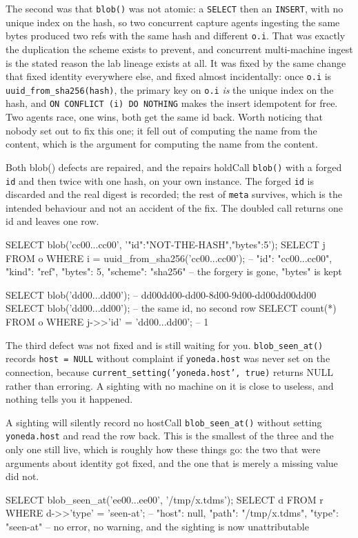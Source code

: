 The second was that \texttt{blob()} was not atomic: a \texttt{SELECT} then an \texttt{INSERT}, with no unique index on the hash, so two concurrent capture agents ingesting the same bytes produced two refs with the same hash and different \texttt{o.i}. That was exactly the duplication the scheme exists to prevent, and concurrent multi-machine ingest is the stated reason the lab lineage exists at all. It was fixed by the same change that fixed identity everywhere else, and fixed almost incidentally: once \texttt{o.i} is \texttt{uuid\_from\_sha256(hash)}, the primary key on \texttt{o.i} \emph{is} the unique index on the hash, and \texttt{ON CONFLICT (i) DO NOTHING} makes the insert idempotent for free. Two agents race, one wins, both get the same id back. Worth noticing that nobody set out to fix this one; it fell out of computing the name from the content, which is the argument for computing the name from the content.

\begin{Correspondence}{Both blob() defects are repaired, and the repairs hold}{Call \texttt{blob()} with a forged \texttt{id} and then twice with one hash, on your own instance.}
The forged \texttt{id} is discarded and the real digest is recorded; the rest of \texttt{meta} survives, which is the intended behaviour and not an accident of the fix. The doubled call returns one id and leaves one row.
\begin{Check}
SELECT blob('cc00...cc00', '{"id":"NOT-THE-HASH","bytes":5}');
SELECT j FROM o WHERE i = uuid_from_sha256('cc00...cc00');
--   {"id": "cc00...cc00", "kind": "ref", "bytes": 5, "scheme": "sha256"}
--   the forgery is gone, "bytes" is kept

SELECT blob('dd00...dd00');   -- dd00dd00-dd00-8d00-9d00-dd00dd00dd00
SELECT blob('dd00...dd00');   -- the same id, no second row
SELECT count(*) FROM o WHERE j->>'id' = 'dd00...dd00';   -- 1
\end{Check}
\end{Correspondence}

The third defect was not fixed and is still waiting for you. \texttt{blob\_seen\_at()} records \texttt{host = NULL} without complaint if \texttt{yoneda.host} was never set on the connection, because \texttt{current\_setting('yoneda.host', true)} returns NULL rather than erroring. A sighting with no machine on it is close to useless, and nothing tells you it happened.

\begin{Correspondence}{A sighting will silently record no host}{Call \texttt{blob\_seen\_at()} without setting \texttt{yoneda.host} and read the row back.}
This is the smallest of the three and the only one still live, which is roughly how these things go: the two that were arguments about identity got fixed, and the one that is merely a missing value did not.
\begin{Check}
SELECT blob_seen_at('ee00...ee00', '/tmp/x.tdms');
SELECT d FROM r WHERE d->>'type' = 'seen-at';
--   {"host": null, "path": "/tmp/x.tdms", "type": "seen-at"}
--   no error, no warning, and the sighting is now unattributable
\end{Check}
\end{Correspondence}


